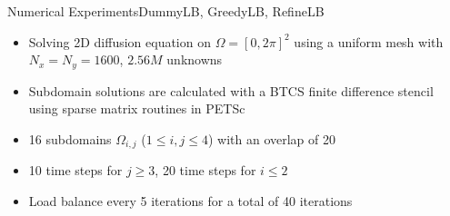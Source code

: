 \documentclass[]{beamer}
\begin{document}




\begin{frame}{Numerical Experiments}{DummyLB, GreedyLB, RefineLB}
  
  \begin{itemize}
  \item Solving 2D diffusion equation on $\Omega = [0,2\pi]^2$ using a
    uniform mesh with $N_x = N_y = 1600$, $2.56M$ unknowns
  \item Subdomain solutions are calculated with a BTCS finite
    difference stencil using sparse matrix routines in PETSc
  \item 16 subdomains $\Omega_{i,j}$ ($1\leq i,j \leq 4$) with an
    overlap of 20
  \item 10 time steps for $j\geq3$, 20 time steps for $i\leq2$
  \item Load balance every 5 iterations for a total of 40 iterations
  \end{itemize}
\end{frame}
\end{document}

